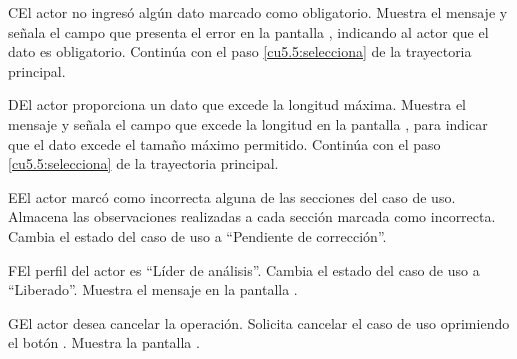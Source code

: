  \begin{UCtrayectoriaA}{C}{El actor no ingresó algún dato marcado como obligatorio.}
    \UCpaso[\UCsist] Muestra el mensaje  y señala el campo que presenta el error en la pantalla , indicando al actor que el dato es obligatorio.
    \UCpaso[] Continúa con el paso \ref{cu5.5:selecciona} de la trayectoria principal.
 \end{UCtrayectoriaA}
 
 \begin{UCtrayectoriaA}{D}{El actor proporciona un dato que excede la longitud máxima.}
    \UCpaso[\UCsist] Muestra el mensaje  y señala el campo que excede la 
    longitud en la pantalla , para indicar que el dato excede el tamaño máximo permitido.
    \UCpaso[] Continúa con el paso \ref{cu5.5:selecciona} de la trayectoria principal.
 \end{UCtrayectoriaA}
 
 \begin{UCtrayectoriaA}{E}{El actor marcó como incorrecta alguna de las secciones del caso de uso.}
    \UCpaso[\UCsist] Almacena las observaciones realizadas a cada sección marcada como incorrecta.
    \UCpaso[\UCsist] Cambia el estado del caso de uso a ``Pendiente de corrección''.
 \end{UCtrayectoriaA}
 
 \begin{UCtrayectoriaA}{F}{El perfil del actor es ``Líder de análisis''.}
 \UCpaso[\UCsist] Cambia el estado del caso de uso a ``Liberado''.
 \UCpaso[\UCsist] Muestra el mensaje  en la pantalla .
 \end{UCtrayectoriaA}
 
 \begin{UCtrayectoriaA}{G}{El actor desea cancelar la operación.}
    \UCpaso[\UCactor] Solicita cancelar el caso de uso oprimiendo el botón .
    \UCpaso[\UCsist] Muestra la pantalla .
 \end{UCtrayectoriaA}